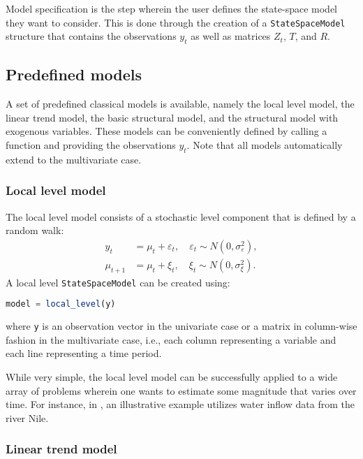 \documentclass{juliacon}
\begin{document}
Model specification is the step wherein the user defines the state-space model they want to consider. This is done through the creation of a \texttt{StateSpaceModel} structure that contains the observations $y_{t}$ as well as matrices $Z_{t}$, $T$, and $R$.

\subsection{Predefined models} \label{subsec:predefined}

A set of predefined classical models is available, namely the local level model, the linear trend model, the basic structural model, and the structural model with exogenous variables. These models can be conveniently defined by calling a function and providing the observations $y_{t}$. Note that all models automatically extend to the multivariate case.

\subsubsection{Local level model}

The local level model consists of a stochastic level component that is defined by a random walk:
%
\begin{align}
    y_{t} &= \mu_{t} + \varepsilon_{t}, \quad \varepsilon_{t} \sim N(0, \sigma^{2}_\varepsilon), \label{eq:locallevel1} \\
    \mu_{t+1} &= \mu_{t} + \xi_{t}, \quad \xi_{t} \sim N(0, \sigma^{2}_\xi). \label{eq:locallevel2}
\end{align}
%
A local level \texttt{StateSpaceModel} can be created using:
%
\begin{lstlisting}[language = Julia]
model = local_level(y)
\end{lstlisting}
%
\noindent where \texttt{y} is an observation vector in the univariate case or a matrix in column-wise fashion in the multivariate case, i.e., each column representing a variable and each line representing a time period.

While very simple, the local level model can be successfully applied to a wide array of problems wherein one wants to estimate some magnitude that varies over time. For instance, in \cite{koopman2000stamp}, an illustrative example utilizes water inflow data from the river Nile.
%

\subsubsection{Linear trend model}
\end{document}
